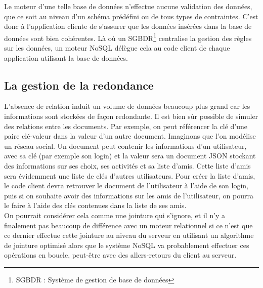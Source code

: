 	Le moteur d'une telle base de données n'effectue aucune validation des données, que ce soit au niveau d'un schéma prédéfini ou de tous types de contraintes. C'est donc à l'application cliente de s'assurer que les données insérées dans la base de données sont bien cohérentes. Là où un SGBDR\footnote{SGBDR : Système de gestion de base de données} centralise la gestion des règles sur les données, un moteur NoSQL délègue cela au code client de chaque application utilisant la base de données.

\subsection{La gestion de la redondance}
	L'absence de relation induit un volume de données beaucoup plus grand car les informations sont stockées de façon redondante. Il est bien sûr possible de simuler des relations entre les documents. Par exemple, on peut référencer la clé d'une paire clé-valeur dans la valeur d'un autre document. Imaginons que l'on modélise un réseau social. Un document peut contenir les informations d'un utilisateur, avec sa clé (par exemple son login) et la valeur sera un document JSON stockant des informations sur ses choix, ses activités et sa liste d'amis. Cette liste d'amis sera évidemment une liste de clés d'autres utilisateurs. Pour créer la liste d'amis, le code client devra retrouver le document de l'utilisateur à l'aide de son login, puis si on souhaite avoir des informations sur les amis de l'utilisateur, on pourra le faire à l'aide des clés contenues dans la liste de ses amis.\\

	On pourrait considérer cela comme une jointure qui s'ignore, et il n'y a finalement pas beaucoup de différence avec un moteur relationnel si ce n'est que ce dernier effectue cette jointure au niveau du serveur en utilisant un algorithme de jointure optimisé alors que le système NoSQL va probablement effectuer ces opérations en boucle, peut-être avec des allers-retours du client au serveur.
